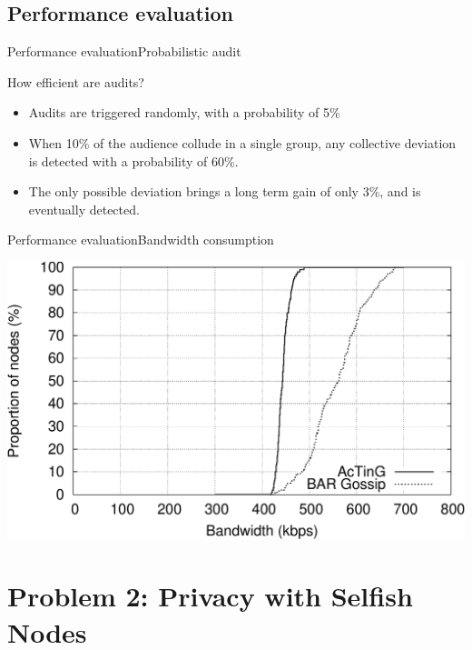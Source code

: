 \documentclass[10pt]{beamer}
\begin{document}
\subsection{Performance evaluation}

\begin{frame}{Performance evaluation}{Probabilistic audit}
   \begin{block}{How efficient are audits?}
      \begin{itemize}
        \item Audits are triggered randomly, with a probability of 5\%
        \item When 10\% of the audience collude in a single group, any collective deviation is detected with a probability of 60\%.
        \item The only possible deviation brings a long term gain of only 3\%, and is eventually detected. 
        \end{itemize}
   \end{block}
\end{frame}

\begin{frame}{Performance evaluation}{Bandwidth consumption}
  \begin{center}
     \includegraphics[height=.6\textheight]{fig/uploadBandwidth.pdf}
  \end{center}
\end{frame}

\section{Problem 2: Privacy with Selfish Nodes}
\end{document}
